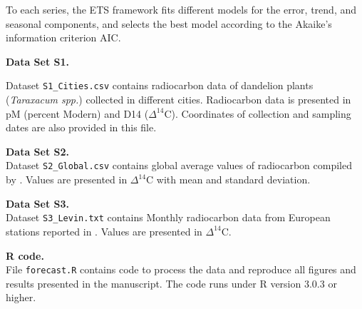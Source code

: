 \documentclass[draft,grl]{agutexSI}
\begin{document}
\begin{article}
To each series, the ETS framework fits different models for the error, trend, and seasonal components, and selects the best model according to the Akaike's information criterion AIC. 

\clearpage

\noindent\textbf{Data Set S1.} %

\noindent
Dataset {\tt S1\_Cities.csv} contains radiocarbon data of dandelion plants ({\it Taraxacum spp.}) collected in different cities. Radiocarbon data is presented in pM (percent Modern) and D14 ($\Delta^{14}$C). Coordinates of collection and sampling dates are also provided in this file. 

\vspace{1cm}

\noindent\textbf{Data Set S2.} \\
Dataset {\tt S2\_Global.csv} contains global average values of radiocarbon compiled by \citet{Hua2013Radiocarbon}. Values are presented in $\Delta^{14}$C with mean and standard deviation. 

\vspace{1cm}

\noindent\textbf{Data Set S3.} \\
Dataset {\tt S3\_Levin.txt} contains Monthly radiocarbon data from European stations reported in \citet{Levin2013Tellus}. Values are presented in $\Delta^{14}$C. 


\vspace{1cm}

\noindent\textbf{R code.} \\
File {\tt forecast.R} contains code to process the data and reproduce all figures and results presented in the manuscript. The code runs under R version 3.0.3 or higher.  









\end{article}
\end{document}
